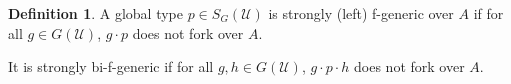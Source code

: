 \documentclass[12pt]{article}
\makeatletter
\newtheorem{cor}[thm]{Corollary}
\newtheorem{fact}[thm]{Fact}
\theoremstyle{definition}
\newtheorem{defi}[thm]{Definition}
\theoremstyle{mystyle}
\theoremstyle{remark}
\newcommand{\monster}{\mathcal U}
\newcommand{\ntp}{NTP$_2$ }
\newcommand{\tp}{\mathrm{tp}}
\def\indsym#1#2{%
 \setbox0=\hbox{$\m@th#1x$}%
 \kern\wd0%
 \hbox to 0pt{\hss$\m@th#1\mid$\hbox to 0pt{$\m@th#1^{#2}$\hss}\hss}%
 \lower.9\ht0\hbox to 0pt{\hss$\m@th#1\smile$\hss}%
 \kern\wd0}
\newcommand{\ind}[1][]{\mathop{\mathpalette\indsym{#1}}}
\makeatother
\begin{document}
%

%
%
%



%
%
%
%

\begin{defi}\label{strong f generics}
A global type $p\in S_G(\monster)$ is strongly (left) f-generic
over $A$ if for all $g\in G(\monster)$, $g\cdot p$ does not fork
over $A$.

It is strongly bi-f-generic if for all $g,h\in G(\monster)$, $g\cdot p \cdot h$ does not fork over $A$.
\end{defi}
\end{document}
